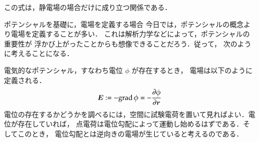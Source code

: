             この式は，静電場の場合だけに成り立つ関係である．

            \begin{memo}{ポテンシャルを基礎に，電場を定義する場合}
                今日では，ポテンシャルの概念より電場を定義することが多い．
                これは解析力学などによって，ポテンシャルの重要性が
                浮かび上がったことからも想像できることだろう．従って，
                次のように考えることになる．

                電気的なポテンシャル，すなわち電位 $\phi$ が存在するとき，
                電場は以下のように定義される．
                \begin{align}
                    \boldsymbol{E}  := -\mathrm{grad}\, \phi =-\frac{\partial \phi}{\partial \boldsymbol{r}}
                \end{align}
                電位の存在するかどうかを調べるには，空間に試験電荷を置いて見ればよい．電位が存在していれば，
                点電荷は電位勾配によって運動し始めるはずである．そしてこのとき，
                電位勾配とは逆向きの電場が生じていると考えるのである．
            \end{memo}

